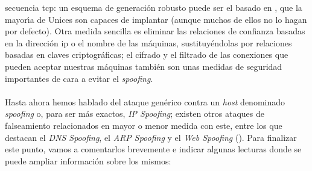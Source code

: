 secuencia {\sc tcp}: un esquema de generaci\'on robusto puede ser el basado en
\cite{kn:rfc1498}, que la mayor\'{\i}a de Unices son capaces de implantar 
(aunque muchos de ellos no lo hagan por defecto). Otra medida sencilla es
eliminar las relaciones de confianza basadas en la direcci\'on {\sc ip} o el
nombre de las m\'aquinas, sustituy\'endolas por relaciones basadas en claves
criptogr\'aficas; el cifrado y el filtrado de las conexiones que pueden aceptar 
nuestras m\'aquinas tambi\'en son unas medidas de seguridad importantes de cara 
a evitar el {\it spoofing}.\\
\\Hasta ahora hemos hablado del ataque gen\'erico contra un {\it host} 
denominado {\it spoofing} o, para ser m\'as exactos, {\it IP Spoofing}; existen
otros ataques de falseamiento relacionados en mayor o menor medida con este, 
entre los que destacan el {\it DNS Spoofing}, el {\it ARP Spoofing} y el {\it
Web Spoofing} (\cite{kn:ris01}). Para finalizar este punto, vamos a comentarlos
brevemente e indicar algunas lecturas donde se puede ampliar informaci\'on 
sobre los mismos:
